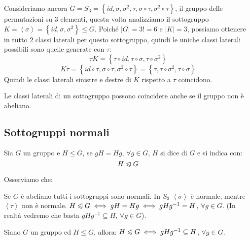 \documentclass[11pt]{scrartcl}
\begin{document}
\begin{example}
Consideriamo ancora $G=S_3 = \left\{id, \sigma, \sigma^2, \tau, \sigma \circ \tau, \sigma^2 \circ \tau\right\}$, il gruppo delle permutazioni su $3$ elementi, 
questa volta analizziamo il sottogruppo $K=\left<\sigma\right> = \left\{id, \sigma, \sigma^2\right\}\leqslant G$. Poiché $|G|=3!=6$ e $|K|=3$, possiamo ottenere in tutto $2$ classi laterali per questo sottogruppo, quindi le uniche classi laterali possibili sono quelle generate con $\tau$:
	\[ \tau K = \left\{\tau \circ id, \tau \circ \sigma, \tau \circ \sigma^2\right\}
	\] \[ K \tau = \left\{id \circ \tau, \sigma \circ \tau, \sigma^2 \circ \tau\right\} = \left\{\tau, \tau \circ \sigma^2, \tau \circ \sigma\right\}
	\]
Quindi le classi laterali sinistre e destre di $K$ rispetto a $\tau$ coincidono.
\end{example}

\begin{remark}
\label{g:ab}
Le classi laterali di un sottogruppo possono coincidere anche se il gruppo non è abeliano.
\end{remark}

\newpage

\subsection{Sottogruppi normali}
\begin{definition}
\label{g:def_sgrn}
Sia $G$ un gruppo e $H \leqslant G$, se $gH=Hg$, $\forall g \in G$, $H$ si dice  di $G$ e si indica con:
	\[ H \trianglelefteqslant G
	\]
\end{definition}

\begin{remark}
Osserviamo che:
\begin{enumerate}[(1)]
	\ii Se $G$ è abeliano tutti i sottogruppi sono normali.
	\ii In $S_3$ $\left<\sigma\right>$ è normale, mentre $\left<\tau\right>$ non è normale.
	\ii $H \trianglelefteqslant G \iff gH = Hg \iff gHg^{-1} = H$, $\forall g \in G$. (In realtà vedremo che basta $gHg^{-1} \subseteq H$, $\forall g \in G$).
\end{enumerate}
\end{remark}

\begin{theorem}
\label{g:sgrN}
Siano $G$ un gruppo ed $H \leqslant G$, allora: $H \trianglelefteqslant G \iff gHg^{-1} \subseteq H$, $\forall g \in G$.
\end{theorem}
\end{document}
